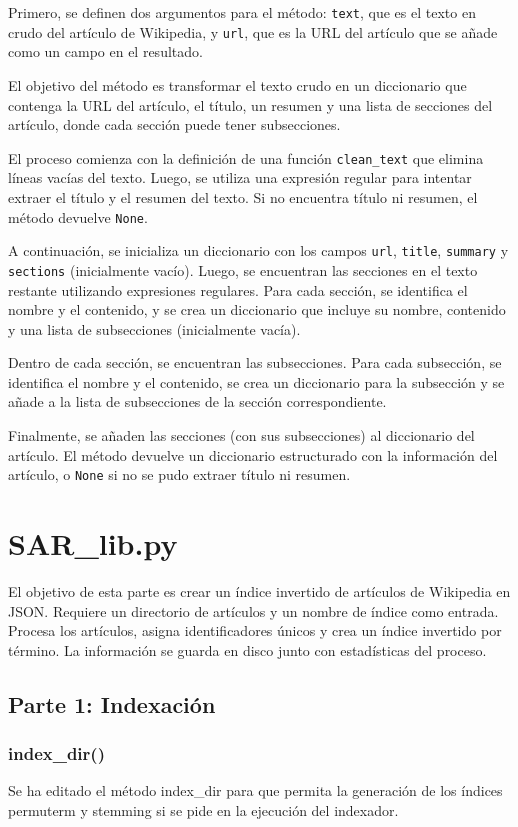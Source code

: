 \documentclass[12pt,a4paper]{article}
\begin{document}
Primero, se definen dos argumentos para el método: \texttt{text}, que es el texto en crudo del artículo de Wikipedia, y \texttt{url}, que es la URL del artículo que se añade como un campo en el resultado.

El objetivo del método es transformar el texto crudo en un diccionario que contenga la URL del artículo, el título, un resumen y una lista de secciones del artículo, donde cada sección puede tener subsecciones.

El proceso comienza con la definición de una función \texttt{clean\_text} que elimina líneas vacías del texto. Luego, se utiliza una expresión regular para intentar extraer el título y el resumen del texto. Si no encuentra título ni resumen, el método devuelve \texttt{None}.

A continuación, se inicializa un diccionario con los campos \texttt{url}, \texttt{title}, \texttt{summary} y \texttt{sections} (inicialmente vacío). Luego, se encuentran las secciones en el texto restante utilizando expresiones regulares. Para cada sección, se identifica el nombre y el contenido, y se crea un diccionario que incluye su nombre, contenido y una lista de subsecciones (inicialmente vacía).

Dentro de cada sección, se encuentran las subsecciones. Para cada subsección, se identifica el nombre y el contenido, se crea un diccionario para la subsección y se añade a la lista de subsecciones de la sección correspondiente.

Finalmente, se añaden las secciones (con sus subsecciones) al diccionario del artículo. El método devuelve un diccionario estructurado con la información del artículo, o \texttt{None} si no se pudo extraer título ni resumen.


\section{SAR\_lib.py}

El objetivo de esta parte es crear un índice invertido de artículos de Wikipedia en JSON. Requiere un directorio de artículos y un nombre de índice como entrada. Procesa los artículos, asigna identificadores únicos y crea un índice invertido por término. La información se guarda en disco junto con estadísticas del proceso.

\subsection{Parte 1: Indexación}
\subsubsection{index\_dir()}
Se ha editado el método index\_dir para que permita la generación de los índices permuterm y stemming si se pide en la ejecución del indexador.
\end{document}
